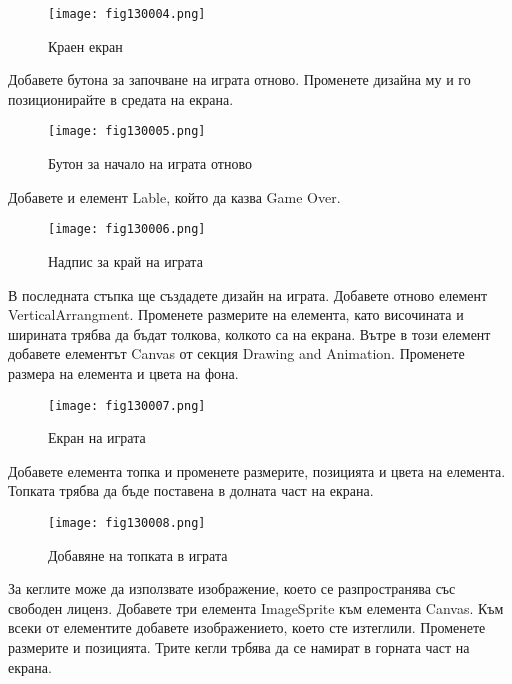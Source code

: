 \begin{figure}[H]
  \centering
  \texttt{[image: fig130004.png]}
  \caption{Краен екран}
\label{fig130004}
\end{figure}

Добавете бутона за започване на играта отново. Променете дизайна му и го позиционирайте в средата на екрана.

\begin{figure}[H]
  \centering
  \texttt{[image: fig130005.png]}
  \caption{Бутон за начало на играта отново}
\label{fig130005}
\end{figure}

Добавете и елемент Lable, който да казва Game Over.

\begin{figure}[H]
  \centering
  \texttt{[image: fig130006.png]}
  \caption{Надпис за край на играта}
\label{fig130006}
\end{figure}

В последната стъпка ще създадете дизайн на играта. Добавете отново елемент VerticalArrangment. Променете размерите на елемента, като височината и ширината трябва да бъдат толкова, колкото са на екрана. Вътре в този елемент добавете елементът Canvas от секция Drawing and Animation. Променете размера на елемента и цвета на фона.

\begin{figure}[H]
  \centering
  \texttt{[image: fig130007.png]}
  \caption{Екран на играта}
\label{fig130007}
\end{figure}

Добавете елемента топка и променете размерите, позицията и цвета на елемента. Топката трябва да бъде поставена в долната част на екрана.

\begin{figure}[H]
  \centering
  \texttt{[image: fig130008.png]}
  \caption{Добавяне на топката в играта}
\label{fig130008}
\end{figure}

За кеглите може да използвате изображение, което се разпространява със свободен лиценз. Добавете три елемента ImageSprite към елемента Canvas. Към всеки от елементите добавете изображението, което сте изтеглили. Променете размерите и позицията. Трите кегли трбява да се намират в горната част на екрана.

